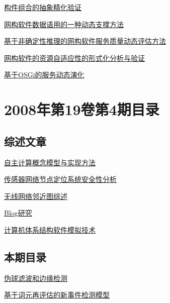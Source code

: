 \documentclass[a4paper]{article}
\begin{document}
\href{http://www.jos.org.cn/ch/reader/download_pdf.aspx?file_no=20080507&year_id=2008&quarter_id=5&falg=1}{构件组合的抽象精化验证}

\href{http://www.jos.org.cn/ch/reader/download_pdf.aspx?file_no=20080508&year_id=2008&quarter_id=5&falg=1}{网构软件数据语用的一种动态支撑方法}

\href{http://www.jos.org.cn/ch/reader/download_pdf.aspx?file_no=20080509&year_id=2008&quarter_id=5&falg=1}{基于非确定性推理的网构软件服务质量动态评估方法}

\href{http://www.jos.org.cn/ch/reader/download_pdf.aspx?file_no=20080510&year_id=2008&quarter_id=5&falg=1}{网构软件的资源自适应性的形式化分析与验证}

\href{http://www.jos.org.cn/ch/reader/download_pdf.aspx?file_no=20080511&year_id=2008&quarter_id=5&falg=1}{基于OSGi的服务动态演化}


\section{\textbf{2008年第19卷第4期目录}}
\subsection{综述文章}
\href{http://www.jos.org.cn/ch/reader/download_pdf.aspx?file_no=20080401&year_id=2008&quarter_id=4&falg=1}{自主计算概念模型与实现方法}

\href{http://www.jos.org.cn/ch/reader/download_pdf.aspx?file_no=20080409&year_id=2008&quarter_id=4&falg=1}{传感器网络节点定位系统安全性分析}

\href{http://www.jos.org.cn/ch/reader/download_pdf.aspx?file_no=20080410&year_id=2008&quarter_id=4&falg=1}{无线网络邻近图综述}

\href{http://www.jos.org.cn/ch/reader/download_pdf.aspx?file_no=20080411&year_id=2008&quarter_id=4&falg=1}{Blog研究}

\href{http://www.jos.org.cn/ch/reader/download_pdf.aspx?file_no=20080422&year_id=2008&quarter_id=4&falg=1}{计算机体系结构软件模拟技术}

\subsection{本期目录}
\href{http://www.jos.org.cn/ch/reader/download_pdf.aspx?file_no=20080402&year_id=2008&quarter_id=4&falg=1}{伪球滤波和边缘检测}

\href{http://www.jos.org.cn/ch/reader/download_pdf.aspx?file_no=20080403&year_id=2008&quarter_id=4&falg=1}{基于词元再评估的新事件检测模型}
\end{document}
